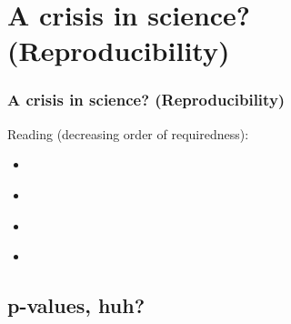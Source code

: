 \documentclass{beamer} %
\newcommand{\1}{\mathbb{1}}
\begin{document}
\section{A crisis in science? (Reproducibility)}

\begin{frame}[t]\frametitle{A crisis in science? (Reproducibility)}
\vspace{3mm}
Reading (decreasing order of requiredness):\\
\vspace{3mm}
\begin{itemize}
	\item \href{http://www.nature.com/news/statisticians-issue-warning-over-misuse-of-p-values-1.19503}{}\\	
	\item \href{http://fivethirtyeight.com/features/science-isnt-broken/}{}\\	
	\item \href{http://www.nature.com/news/scientific-method-statistical-errors-1.14700}{}\\	
	\item \href{http://marginalrevolution.com/marginalrevolution/2016/07/results-free-review.html}{}\\	
\end{itemize}

\end{frame}


\subsection{p-values, huh?}
\end{document}
